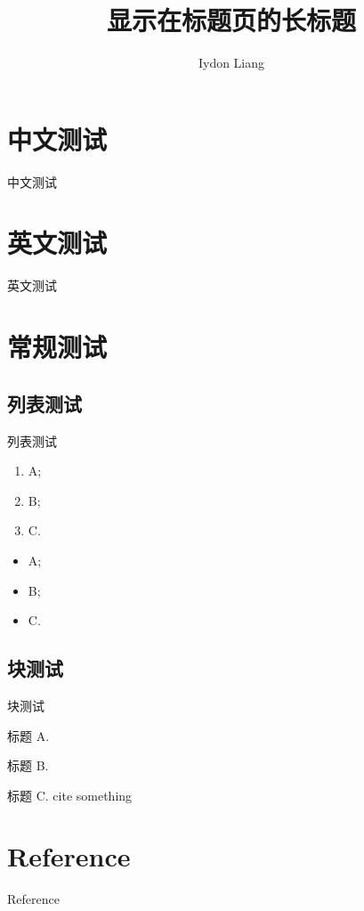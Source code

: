 \documentclass{ctexbeamer}
\title[短标题]{显示在标题页的长标题}
\author[Iydon]{Iydon Liang}
\institute[SUSTech]{Southern University of Science and Technology}
\begin{document}
\section{中文测试}
  \begin{frame}{中文测试}
    \zhlipsum[1]
  \end{frame}

\section{英文测试}
  \begin{frame}{英文测试}
    \lipsum[1]
  \end{frame}

\section{常规测试}
  \subsection{列表测试}
    \begin{frame}[<+->][t]{列表测试}
        \begin{enumerate}
        \item A;
        \item B;
        \item C.
        \end{enumerate}
        \begin{itemize}
        \item A;
        \item B;
        \item C.
        \end{itemize}
    \end{frame}

  \subsection{块测试}
    \begin{frame}[<+->][t]{块测试}
        \begin{block}{标题}
        A.
        \end{block}
        \begin{block}{标题}
        B.
        \end{block}
        \begin{block}{标题}
        C. cite something\cite{Nicholas1998Handbook}
        \end{block}
    \end{frame}

\section{Reference}
  \begin{frame}[t,allowframebreaks]{Reference}
    \printbibliography[]
  \end{frame}
    
\end{document}
